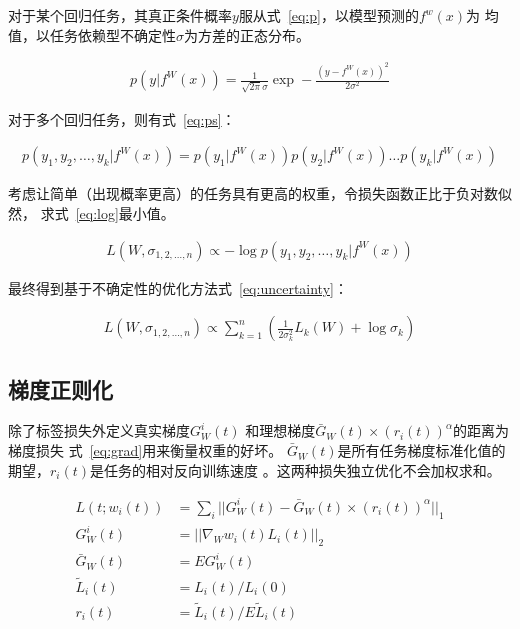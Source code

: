 \documentclass[../main]{subfiles}
\begin{document}
对于某个回归任务，其真正条件概率$y$服从式~\ref{eq:p}，以模型预测的$f^w(x)$为
均值，以任务依赖型不确定性$\sigma$为方差的正态分布\cite{Kendall_2018_CVPR}。

\begin{align}
  \label{eq:p}
  p(y|f^W(x)) = \frac{1}{\sqrt{2\pi}\sigma}\exp-\frac{{(y - f^W(x))}^2}{2\sigma^2}
\end{align}

对于多个回归任务，则有式~\ref{eq:ps}：

\begin{align}
  \label{eq:ps}
  p(y_1, y_2, \ldots, y_k|f^W(x)) = p(y_1|f^W(x))p(y_2|f^W(x)) \ldots p(y_k|f^W(x))
\end{align}

考虑让简单（出现概率更高）的任务具有更高的权重，令损失函数正比于负对数似然，
求式~\ref{eq:log}最小值。

\begin{align}
  \label{eq:log}
  L(W, \sigma_{1, 2, \ldots, n}) \propto -\log p(y_1, y_2, \ldots, y_k|f^W(x))
\end{align}

最终得到基于不确定性的优化方法式~\ref{eq:uncertainty}：

\begin{align}
  \label{eq:uncertainty}
  L(W, \sigma_{1, 2, \ldots, n}) \propto \sum_{k = 1}^n(\frac{1}{2\sigma_k^2}L_k(W) + \log\sigma_k)
\end{align}

\subsection{梯度正则化}%
\label{sub:gradnorm}

\cite{DBLP:journals/corr/abs-1711-02257}除了标签损失外定义真实梯度$G_W^i(t)$
和理想梯度$\bar{G}_W(t) \times {(r_i(t))}^\alpha$的距离为梯度损失
式~\ref{eq:grad}用来衡量权重的好坏。
$\bar{G}_W(t)$是所有任务梯度标准化值的期望，$r_i(t)$是任务的相对反向训练速度
。这两种损失独立优化不会加权求和。

\begin{align}
  \label{eq:grad}
  L(t; w_i(t)) & = \sum_i||G_W^i(t) - \bar{G}_W(t) \times {(r_i(t))}^\alpha||_1 \\
  G_W^i(t) & = || \nabla_W w_i(t)L_i(t) ||_2 \\
  \bar{G}_W(t) & = E G_W^i(t) \\
  \tilde{L}_i(t) & = L_i(t)/L_i(0) \\
  r_i(t) & = \tilde{L}_i(t)/E \tilde{L}_i(t)
\end{align}
\end{document}
